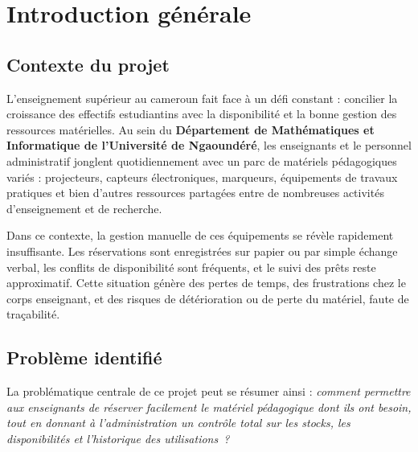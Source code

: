 \documentclass[12pt,a4paper]{report}
\begin{document}

\tableofcontents
\thispagestyle{fancy}

\chapter{Introduction g\'en\'erale}

\section{Contexte du projet}

L'enseignement sup\'erieur au cameroun  fait face \`a un
d\'efi constant : concilier la croissance des effectifs estudiantins
avec la disponibilit\'e et la bonne gestion des ressources mat\'erielles.
Au sein du \textbf{D\'epartement de Math\'ematiques et Informatique de
l'Universit\'e de Ngaound\'er\'e}, les enseignants et le personnel
administratif jonglent quotidiennement avec un parc de mat\'eriels
p\'edagogiques vari\'es : projecteurs, capteurs \'electroniques,
marqueurs, \'equipements de travaux pratiques et bien d'autres ressources
partag\'ees entre de nombreuses activit\'es d'enseignement et de recherche.

Dans ce contexte, la gestion manuelle de ces \'equipements se r\'ev\`ele
rapidement insuffisante. Les r\'eservations sont enregistr\'ees sur papier
ou par simple \'echange verbal, les conflits de disponibilit\'e sont
fr\'equents, et le suivi des pr\^ets reste approximatif. Cette situation
g\'en\`ere des pertes de temps, des frustrations chez le corps enseignant,
et des risques de d\'et\'erioration ou de perte du mat\'eriel, faute
de tra\c{c}abilit\'e.

\section{Probl\`eme identifi\'e}

La probl\'ematique centrale de ce projet peut se r\'esumer ainsi :
\textit{comment permettre aux enseignants de r\'eserver facilement le
mat\'eriel p\'edagogique dont ils ont besoin, tout en donnant \`a
l'administration un contr\^ole total sur les stocks, les disponibilit\'es
et l'historique des utilisations~?}
\end{document}
